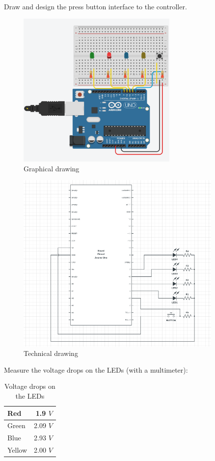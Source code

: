 \documentclass[10pt]{article}
\begin{document}
\newpage
Draw and design the press button interface to the controller.

\begin{figure}[H]
    \centering
    \includegraphics[width=0.7\textwidth]{button_circuit.png}
    \caption{Graphical drawing}
\end{figure}

\begin{figure}[H]
    \centering
    \includegraphics[width=0.9\textwidth]{circuit2.png}
    \caption{Technical drawing}
\end{figure}

Measure the voltage drops on the LEDs (with a multimeter):

\begin{table}[!h]
    \centering
    \begin{tabular}{l|r}
        Red & 1.9 $V$ \\ \hline
        Green & 2.09 $V$ \\ \hline
        Blue & 2.93 $V$ \\ \hline
        Yellow & 2.00 $V$ \\
    \end{tabular}
    \caption{Voltage drops on the LEDs}
\end{table}
\end{document}
